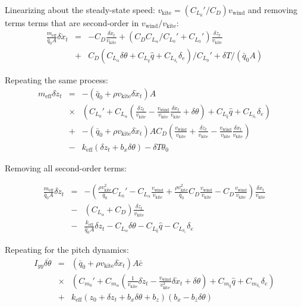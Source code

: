 \documentclass[11pt]{amsart}
\newcommand{\cbar}{\bar{c}}
\newcommand{\qbar}{\bar{q}}
\newcommand{\eff}{\mathrm{eff}}
\newcommand{\wind}{\mathrm{wind}}
\newcommand{\kite}{\mathrm{kite}}
\begin{document}
Linearizing about the steady-state speed: $v_{\kite} = (C_{L_0}'/C_D) v_{\wind}$
and removing terms terms that are second-order in $v_{\wind}/v_{\kite}$:
\begin{eqnarray}
\frac{m_{\eff}}{\qbar_0 A} \delta \ddot{x}_t &=&
-C_D \frac{\delta \dot{x}_t}{v_{\kite}} +
\left(C_D C_{L_{\alpha}}/C_{L_0}' + C_{L_0}' \right)
\frac{\delta \dot{z}_t}{v_{\kite}} \\
&+& C_D \left( C_{L_{\alpha}} \delta \theta + C_{L_{\hat{q}}} \hat{q} +
C_{L_{\delta_e}} \delta_e \right) / C_{L_0}' + \delta T /(\qbar_0 A)
\end{eqnarray}

Repeating the same process:
\begin{eqnarray}
m_{\eff} \delta \ddot{z}_t &=&
-\left(\qbar_0 + \rho v_{\kite} \delta \dot{x}_t \right) A \\
&\times& \left( C_{L_0}' + C_{L_{\alpha}}
\left( \frac{\delta \dot{z}_t}{v_{\kite}} -
\frac{v_{\wind}}{v_{\kite}} \frac{\delta \dot{x}_t}{v_{\kite}} +
\delta \theta \right) + C_{L_{\hat{q}}} \hat{q} + C_{L_{\delta_e}} \delta_e \right) \\
&+& -\left(\qbar_0 + \rho v_{\kite} \delta \dot{x}_t \right) A C_D
\left( \frac{v_{\wind}}{v_{\kite}} + \frac{\delta \dot{z}_t}{v_{\kite}} -
\frac{v_{\wind}}{v_{\kite}} \frac{\delta \dot{x}_t}{v_{\kite}} \right) \\
&-& k_{\eff} (\delta z_t + b_x \delta \theta) - \delta T \theta_0
\end{eqnarray}

Removing all second-order terms:

\begin{eqnarray}
\frac{m_{\eff}}{\qbar_0 A} \delta \ddot{z}_t &=&
-\left(\frac{\rho v_{\kite}^2}{\qbar_0} C_{L_0}' -
C_{L_{\alpha}} \frac{v_{\wind}}{v_{\kite}} +
\frac{\rho v_{\kite}^2}{\qbar_0} C_D \frac{v_{\wind}}{v_{\kite}} -
C_D \frac{v_{\wind}}{v_{\kite}}\right)
\frac{\delta \dot{x}_t}{v_{\kite}} \\
&-& \left(C_{L_{\alpha}} + C_D \right) \frac{\delta \dot{z}_t}{v_{\kite}} \\
&-& \frac{k_{\eff}}{\qbar_0 A} \delta z_t - C_{L_{\alpha}} \delta \theta -
C_{L_{\hat{q}}} \hat{q} - C_{L_{\delta_e}} \delta_e
\end{eqnarray}

Repeating for the pitch dynamics:
\begin{eqnarray}
I_{yy} \delta \ddot{\theta} &=&
\left(\qbar_0 + \rho v_{\kite} \delta \dot{x}_t \right) A \cbar \\
&\times& \left( C_{m_0}' + C_{m_{\alpha}} \left( \frac{1}{v_{\kite}} \delta \dot{z}_t -
\frac{v_{\wind}}{v_{\kite}^2} \delta \dot{x}_t + \delta \theta \right) +
C_{m_{\hat{q}}} \hat{q} +
C_{m_{\delta_e}} \delta_e \right) \\
&+& k_{\eff} (z_0 + \delta z_t + b_x \delta \theta + b_z) (b_x - b_z \delta \theta)
\end{eqnarray}
\end{document}
